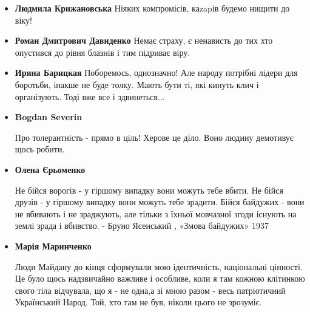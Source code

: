 \begin{itemize}
\item \textbf{Людмила Крижановська}
Ніяких компромісів, каzapів будемо нищити до віку!

\item \textbf{Роман Дмитрович Давиденко}
Немає страху, є ненависть до тих хто опустився до рівня блазнів і тим підриває віру.

\item \textbf{Ирина Барицкая}
Поборемось, однозначно! Але народу потрібні лідери для боротьби, інакше не буде
толку. Мають бути ті, які кинуть клич і організують. Тоді вже все
і здвинеться... 

\item \textbf{Bogdan Severin}

Про толерантність - прямо в ціль! 
Херове це діло. Воно людину демотивує щось робити.

\item \textbf{Олена Єрьоменко}

Не бійся ворогів - у гіршому випадку вони можуть тебе вбити.
Не бійся друзів - у гіршому випадку вони можуть тебе зрадити.
Бійся байдужих - вони не вбивають і не зраджують, але тільки з їхньої мовчазної згоди існують на землі зрада і вбивство.
- Бруно Ясенський , «Змова байдужих» 1937

\item \textbf{Марія Маринченко}

Люди Майдану до кінця сформували мою ідентичність, національні цінності. Це
було щось надзвичайно важливе і особливе, коли я там кожною
клітинкою свого тіла відчувала, що я - не одна,а зі мною разом
- весь патріотичний Український Народ. Той, хто там не був,
ніколи цього не зрозуміє.
\end{itemize}
